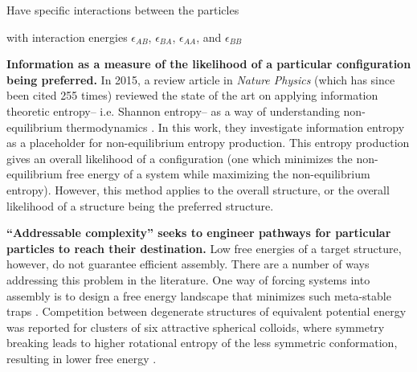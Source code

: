 Have specific interactions between the particles

with interaction energies $\epsilon_{AB}$, $\epsilon_{BA}$, $\epsilon_{AA}$, and $\epsilon_{BB}$

\textbf{Information as a measure of the likelihood of a particular configuration being preferred.}
In 2015, a review article in \textit{Nature Physics} (which has since been cited 255 times) reviewed the state of the art on applying information theoretic entropy-- i.e. Shannon entropy-- as a way of understanding non-equilibrium thermodynamics \cite{Parrondo_2015_NaturePhysics}.
In this work, they investigate information entropy as a placeholder for non-equilibrium entropy production.
This entropy production gives an overall likelihood of a configuration (one which minimizes the non-equilibrium free energy of a system while maximizing the non-equilibrium entropy).
However, this method applies to the overall structure, or the overall likelihood of a structure being the preferred structure.

\textbf{``Addressable complexity'' seeks to engineer pathways for particular particles to reach their destination.}
Low free energies of a target structure, however, do not guarantee efficient assembly.
There are a number of ways addressing this problem in the literature.
One way of forcing systems into assembly is to design a free energy landscape that minimizes such meta-stable traps \cite{Wales_2017_JChemPhys}.
Competition between degenerate structures of equivalent potential energy was reported for clusters of six attractive spherical colloids, where symmetry breaking leads to higher rotational entropy of the less symmetric conformation, resulting in lower free energy \cite{Meng_2010_Science}.

